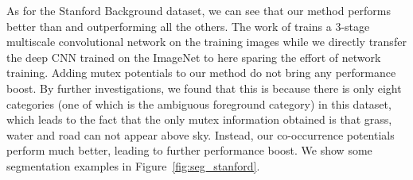 \documentclass[10pt,3p]{elsarticle}
\begin{document}
As for the Stanford Background dataset, we can see that our method performs better than \cite{Lecun13} and outperforming all the others.
The work of \cite{Lecun13} trains a 3-stage multiscale convolutional network on the training images while we directly transfer the deep CNN trained on the ImageNet to here sparing the effort of network training.
Adding mutex potentials to our method do not bring any performance boost. By further investigations, we found that this is because there is only eight categories (one of which is the ambiguous foreground category) in this dataset, which leads to the fact that the only mutex information obtained is that grass, water and road can not appear above sky.  
Instead, our co-occurrence potentials perform much better, leading to further performance boost.
We show some segmentation examples in Figure~\ref{fig:seg_stanford}.
\end{document}
